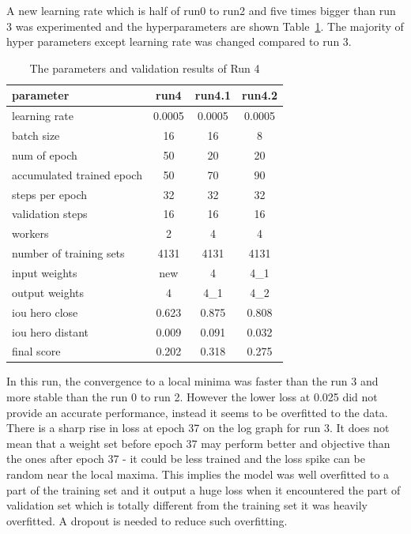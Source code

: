 \documentclass[paper=a4, fontsize=11pt]{scrartcl} %
\numberwithin{equation}{section} %
\numberwithin{figure}{section} %
\numberwithin{table}{section} %
\begin{document}
A new learning rate which is half of run0 to run2 and five times bigger than run 3 was experimented and the hyperparameters are shown Table~\ref{tab:parameters4}. The majority of hyper parameters except learning rate was changed compared to run 3.
\begin{table}
	\begin{center}
		\begin{tabular}{ l | c | c | c }
		\hline
		parameter & run4 & run4.1 & run4.2 \\ \hline
		learning rate & 0.0005 & 0.0005 & 0.0005 \\ \hline
		batch size    & 16 & 16 & 8\\ \hline
		num of epoch  & 50 & 20 & 20\\ \hline
		accumulated trained epoch & 50 & 70 & 90\\ \hline
		steps per epoch & 32 & 32  & 32\\ \hline
		validation steps & 16 & 16 & 16\\ \hline
		workers & 2 & 4  & 4\\ \hline
		number of training sets & 4131 & 4131 & 4131\\ \hline
		input weights & new & 4 & 4\_1 \\ \hline
		output weights & 4 & 4\_1 & 4\_2\\ 		
		
		\hline \hline
		iou hero close & 0.623 & 0.875 & 0.808\\ \hline	  
		iou hero distant & 0.009 & 0.091 & 0.032\\ \hline
		final score & 0.202 & 0.318 & 0.275\\
		\hline
		\end{tabular}
		\caption{The parameters and validation results of Run 4}
		\label{tab:parameters4}
	\end{center}
\end{table}

In this run, the convergence to a local minima was faster than the run 3 and more stable than the run 0 to run 2. However the lower loss at 0.025 did not provide an accurate performance, instead it seems to be overfitted to the data. There is a sharp rise in loss at epoch 37 on the log graph for run 3. It does not mean that a weight set before epoch 37 may perform better and objective than the ones after epoch 37 - it could be less trained and the loss spike can be random near the local maxima. This implies the model was well overfitted to a part of the training set and it output a huge loss when it encountered the part of validation set which is totally different from the training set it was heavily overfitted. A dropout is needed to reduce such overfitting.
\end{document}
